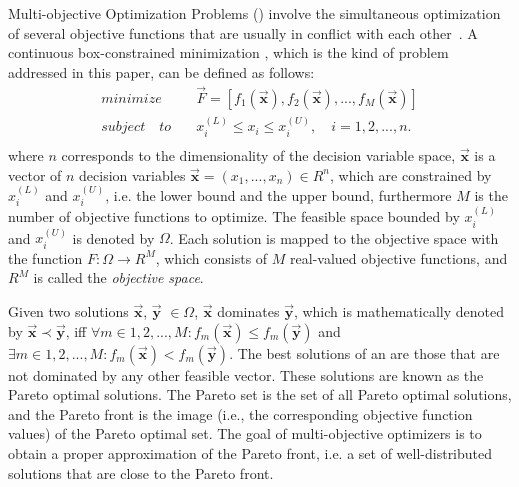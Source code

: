 Multi-objective Optimization Problems (\MOPS{}) 
involve the simultaneous optimization of several objective functions that are usually in conflict with each other~\citep{Joel:Kalyanmoy}. 
%
A continuous box-constrained minimization \MOP{}, which is the kind of problem addressed in this paper, can be defined as follows:
\begin{equation}
   \begin{split}
    minimize \quad & \vec{F} = [f_1(\vec{\mathbf{x}}), f_2(\vec{\mathbf{x}}), ..., f_M(\vec{\mathbf{x}})] \\
   subject \quad to \quad &  x_i^{(L)} \leq x_i \leq x_i^{(U)}, \quad i=1,2,..., n. \\
   \end{split}
\end{equation}
where $n$ corresponds to the dimensionality of the decision variable space, $\vec{\mathbf{x}}$ is a vector of $n$ 
decision variables $\vec{\mathbf{x}}=(x_1, ..., x_n) \in R^n$, which are constrained by $x_i^{(L)}$ 
and $x_i^{(U)}$, i.e. the lower bound and the upper bound, furthermore $M$ is the number of objective functions
to optimize.
%
The feasible space bounded by $x_i^{(L)}$ and $x_i^{(U)}$ is denoted by $\Omega$.
Each solution is mapped to the objective space with the function $F : \Omega \rightarrow R^M$, 
which consists of $M$ real-valued objective functions, and $R^M$ is called the \textit{objective space}. 

Given two solutions $\vec{\mathbf{x}}$, $\vec{\mathbf{y}}$ $\in \Omega$, $\vec{\mathbf{x}}$ dominates $\vec{\mathbf{y}}$, 
which is mathematically denoted by $\vec{\mathbf{x}} \prec \vec{\mathbf{y}}$, iff $\forall m \in {1,2,...,M} : 
f_m(\vec{\mathbf{x}}) \leq f_m(\vec{\mathbf{y}})$ and $\exists  m \in {1,2,...,M} : f_m(\vec{\mathbf{x}}) < f_m(\vec{\mathbf{y}})$.
%
The best solutions of an \MOP{} are those that are not dominated by any other feasible vector.
%
These solutions are known as the Pareto optimal solutions.
%
The Pareto set is the set of all Pareto optimal solutions, and the Pareto front is the image (i.e., the corresponding
objective function values) of the Pareto optimal set. 
%
The goal of multi-objective optimizers is to obtain a proper approximation of the Pareto front, i.e.
a set of well-distributed solutions that are close to the Pareto front.

